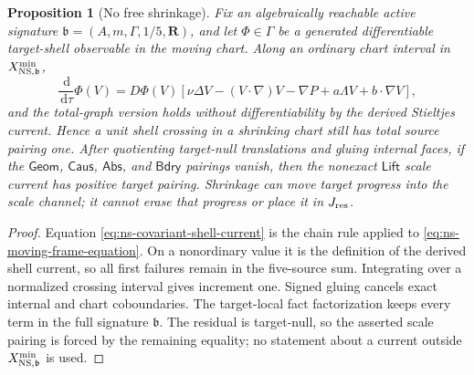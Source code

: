 \documentclass[11pt]{article}
\numberwithin{section}{part}
\theoremstyle{plain}
\newtheorem{proposition}[proposition]{Proposition}
\theoremstyle{definition}
\theoremstyle{remark}
\newcommand{\dd}{\,\mathrm d}
\newcommand{\Geom}{\mathsf{Geom}}
\newcommand{\Caus}{\mathsf{Caus}}
\newcommand{\Abs}{\mathsf{Abs}}
\newcommand{\Lift}{\mathsf{Lift}}
\newcommand{\Bdry}{\mathsf{Bdry}}
\begin{document}
\begin{proposition}[No free shrinkage]
\label{prop:ns-no-free-shrinkage}
Fix an algebraically reachable active signature
\(\mathfrak b=(A,m,\Gamma,1/5,\mathbf R)\), and let
\(\Phi\in\Gamma\) be a generated differentiable target-shell observable in
the moving chart.  Along an ordinary chart interval in
\(X^{\min}_{{\rm NS},\mathfrak b}\),
\begin{equation}
 \label{eq:ns-covariant-shell-current}
 \frac{\dd}{\dd\tau}\Phi(V)
 =D\Phi(V)\!\left[
 \nu\Delta V-(V\cdot\nabla)V-\nabla P
 +a\Lambda V+b\cdot\nabla V\right],
\end{equation}
and the total-graph version holds without differentiability by the derived
Stieltjes current.  Hence a unit shell crossing in a shrinking chart still
has total source pairing one.  After quotienting target-null translations
and gluing internal faces, if the \(\Geom\), \(\Caus\), \(\Abs\), and
\(\Bdry\) pairings vanish, then the nonexact \(\Lift\) scale current has
positive target pairing.  Shrinkage can move target progress into the scale
channel; it cannot erase that progress or place it in \(J_{\rm res}\).
\end{proposition}

\begin{proof}
Equation \eqref{eq:ns-covariant-shell-current} is the chain rule applied to
\eqref{eq:ns-moving-frame-equation}.  On a nonordinary value it is the
definition of the derived shell current, so all first failures remain in the
five-source sum.  Integrating over a normalized crossing interval gives
increment one.  Signed gluing cancels exact internal and chart coboundaries.
The target-local fact factorization keeps every term in the full signature
\(\mathfrak b\).  The residual is target-null, so the asserted scale pairing
is forced by the remaining equality; no statement about a current outside
  \(X^{\min}_{{\rm NS},\mathfrak b}\) is used.
\end{proof}
\end{document}
